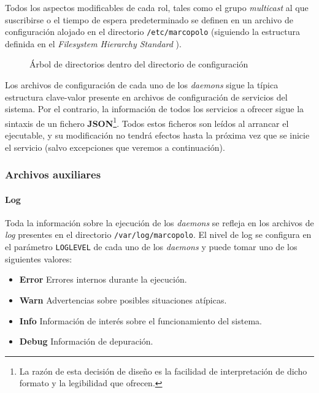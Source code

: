 Todos los aspectos modificables de cada rol, tales como el grupo \textit{multicast} al que suscribirse o el tiempo de espera predeterminado se definen en un archivo de configuración alojado en el directorio \texttt{/etc/marcopolo} (siguiendo la estructura definida en el \textit{Filesystem Hierarchy Standard} \cite{fhs}).

\begin{figure}[H]
\centering
{} %
\caption{Árbol de directorios dentro del directorio de configuración}
\label{fig:arbol_marcopoloconf}
\end{figure}

Los archivos de configuración de cada uno de los \textit{daemons} sigue la típica estructura clave-valor presente en archivos de configuración de servicios del sistema. Por el contrario, la información de todos los servicios a ofrecer sigue la sintaxis de un fichero \textbf{JSON}\footnote{La razón de esta decisión de diseño es la facilidad de interpretación de dicho formato y la legibilidad que ofrecen.}. Todos estos ficheros son leídos al arrancar el ejecutable, y su modificación no tendrá efectos hasta la próxima vez que se inicie el servicio (salvo excepciones que veremos a continuación).


\subsubsection{Archivos auxiliares}

\paragraph{Log}
Toda la información sobre la ejecución de los \textit{daemons} se refleja en los archivos de \textit{log} presentes en el directorio \texttt{/var/log/marcopolo}. El nivel de log se configura en el parámetro \texttt{LOGLEVEL} de cada uno de los \textit{daemons} y puede tomar uno de los siguientes valores:

\begin{itemize}
\item \textbf{Error} Errores internos durante la ejecución.
\item \textbf{Warn} Advertencias sobre posibles situaciones atípicas.
\item \textbf{Info} Información de interés sobre el funcionamiento del sistema.
\item \textbf{Debug} Información de depuración.
\end{itemize}

